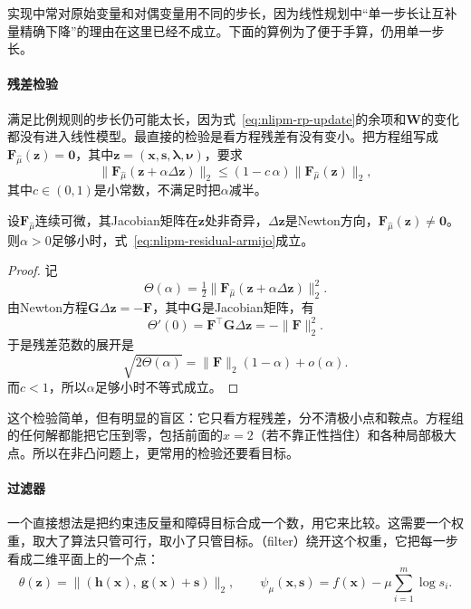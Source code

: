 实现中常对原始变量和对偶变量用不同的步长，因为线性规划中“单一步长让互补量精确下降”的理由在这里已经不成立。下面的算例为了便于手算，仍用单一步长。

\paragraph{残差检验}
满足比例规则的步长仍可能太长，因为式~\eqref{eq:nlipm-rp-update}的余项和$\bm{W}$的变化都没有进入线性模型。最直接的检验是看方程残差有没有变小。把方程组写成$\bm{F}_{\hat{\mu}}(\bm{z})=\bm{0}$，其中$\bm{z}=(\bm{x},\bm{s},\bm{\lambda},\bm{\nu})$，要求
\begin{equation}
 \lVert\bm{F}_{\hat{\mu}}(\bm{z}+\alpha\Delta\bm{z})\rVert_2\leq(1-c\,\alpha)\lVert\bm{F}_{\hat{\mu}}(\bm{z})\rVert_2,
 \label{eq:nlipm-residual-armijo}
\end{equation}
其中$c\in(0,1)$是小常数，不满足时把$\alpha$减半。

\begin{lemma}[Newton方向使残差下降]
\label{lem:nlipm-residual-descent}
设$\bm{F}_{\hat{\mu}}$连续可微，其Jacobian矩阵在$\bm{z}$处非奇异，$\Delta\bm{z}$是Newton方向，$\bm{F}_{\hat{\mu}}(\bm{z})\neq\bm{0}$。则$\alpha>0$足够小时，式~\eqref{eq:nlipm-residual-armijo}成立。
\end{lemma}

\begin{proof}
记
\[
 \Theta(\alpha)=\tfrac12\lVert\bm{F}_{\hat{\mu}}(\bm{z}+\alpha\Delta\bm{z})\rVert_2^2.
\]
由Newton方程$\bm{G}\Delta\bm{z}=-\bm{F}$，其中$\bm{G}$是Jacobian矩阵，有
\[
 \Theta'(0)=\bm{F}^\top\bm{G}\Delta\bm{z}=-\lVert\bm{F}\rVert_2^2.
\]
于是残差范数的展开是
\[
 \sqrt{2\Theta(\alpha)}=\lVert\bm{F}\rVert_2(1-\alpha)+o(\alpha).
\]
而$c<1$，所以$\alpha$足够小时不等式成立。
\end{proof}

这个检验简单，但有明显的盲区：它只看方程残差，分不清极小点和鞍点。方程组的任何解都能把它压到零，包括前面的$x=2$（若不靠正性挡住）和各种局部极大点。所以在非凸问题上，更常用的检验还要看目标。

\paragraph{过滤器}
一个直接想法是把约束违反量和障碍目标合成一个数，用它来比较。这需要一个权重，取大了算法只管可行，取小了只管目标。（filter）绕开这个权重，它把每一步看成二维平面上的一个点：
\begin{equation}
 \theta(\bm{z})=\bigl\lVert(\bm{h}(\bm{x}),\ \bm{g}(\bm{x})+\bm{s})\bigr\rVert_2,\qquad
 \psi_\mu(\bm{x},\bm{s})=f(\bm{x})-\mu\sum_{i=1}^m\log s_i.
 \label{eq:nlipm-filter-pair}
\end{equation}

